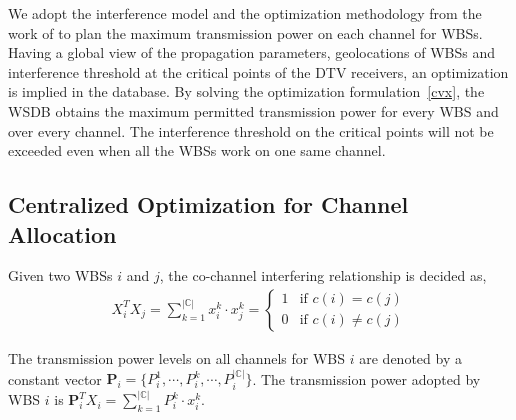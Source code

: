 \documentclass[times]{ettauth}
\theoremstyle{mytheoremstyle}
\theoremstyle{mytheoremstyle}
\theoremstyle{mytheoremstyle}
\renewcommand{\vec}[1]{\mathbf{#1}}
\begin{document}
We adopt the interference model and the optimization methodology from the work of \cite{multipleIntf_pimrc11} to plan the maximum transmission power on each channel for WBSs.
Having a global view of the propagation parameters, geolocations of WBSs and interference threshold at the critical points of the DTV receivers, an optimization is implied in the database.
By solving the optimization formulation~\ref{cvx}, the WSDB obtains the maximum permitted transmission power for every WBS and over every channel.
The interference threshold on the critical points will not be exceeded even when all the WBSs work on one same channel.


\subsection{Centralized Optimization for Channel Allocation}
\label{03_centralized_ca}

Given two WBSs $i$ and $j$, the co-channel interfering relationship is decided as,
\begin{equation}
\begin{split}
X_i^TX_j = \sum\limits_{k=1}^{|\mathbb{C}|}x_i^k\cdot x_j^k = 
\left\{ \begin{array}{ll}
1 & \mbox{if $c(i)=c(j)$} \\
0 & \mbox{if $c(i)\neq c(j)$} 
\end{array}
\right.
\end{split}
\end{equation}

The transmission power levels on all channels for WBS $i$ are denoted by a constant vector $\vec{P}_i = \{P_i^1,\cdots, P_i^k,\cdots, P_i^{|\mathbb{C}|}\}$. 
The transmission power adopted by WBS $i$ is $\vec{P}_i^TX_i = \sum\limits_{k=1}^{|\mathbb{C}|}P_{i}^k\cdot x_i^k$.
\end{document}
